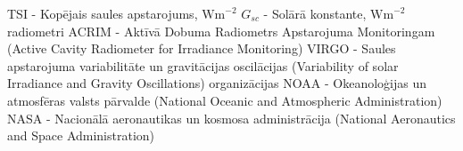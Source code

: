 TSI - Kopējais saules apstarojums, $\textrm{Wm}^{-2}$
$G_{sc}$ - Solārā konstante, $\textrm{Wm}^{-2}$
radiometri
ACRIM - Aktīvā Dobuma Radiometrs Apstarojuma Monitoringam (Active Cavity Radiometer for Irradiance Monitoring)
VIRGO - Saules apstarojuma variabilitāte un gravitācijas oscilācijas (Variability of solar Irradiance and Gravity Oscillations)
organizācijas
NOAA - Okeanoloģijas un atmosfēras valsts pārvalde (National Oceanic and Atmospheric Administration)
NASA - Nacionālā aeronautikas un kosmosa administrācija  (National Aeronautics and Space Administration)